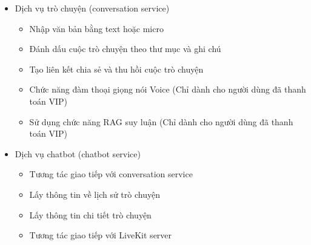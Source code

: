 \begin{itemize}


\item Dịch vụ trò chuyện (conversation service)


\begin{itemize}


\item Nhập văn bản bằng text hoặc micro
\item Đánh dấu cuộc trò chuyện theo thư mục và ghi chú
\item Tạo liên kết chia sẻ và thu hồi cuộc trò chuyện
\item Chức năng đàm thoại giọng nói Voice (Chỉ dành cho người dùng đã thanh toán VIP)
\item Sử dụng chức năng RAG suy luận (Chỉ dành cho người dùng đã thanh toán VIP)
\end{itemize}


\item Dịch vụ chatbot (chatbot service)


\begin{itemize}


\item Tương tác giao tiếp với conversation service
\item Lấy thông tin về lịch sử trò chuyện
\item Lấy thông tin chi tiết trò chuyện
\item Tương tác giao tiếp với LiveKit server
\end{itemize}

\end{itemize}
